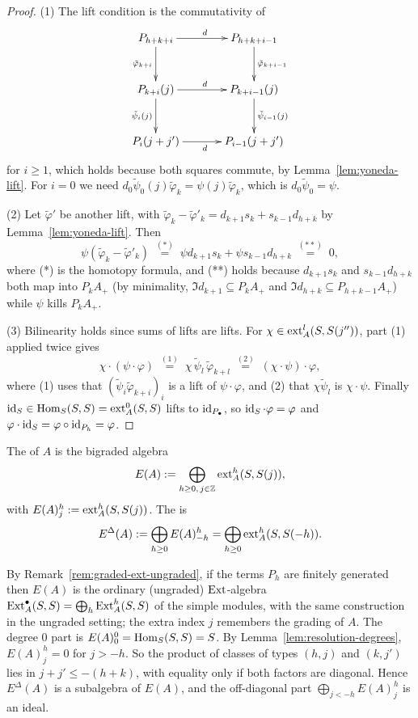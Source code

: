 \begin{proof}
(1) The lift condition is the commutativity of
\[
\xymatrix@C=34pt@R=30pt{
P_{h+k+i}\ar[r]^{d}\ar[d]_{\tilde\varphi_{k+i}}&P_{h+k+i-1}\ar[d]^{\tilde\varphi_{k+i-1}}\\
P_{k+i}(j)\ar[r]^{d}\ar[d]_{\tilde\psi_i(j)}&P_{k+i-1}(j)\ar[d]^{\tilde\psi_{i-1}(j)}\\
P_i(j+j')\ar[r]_{d}&P_{i-1}(j+j')
}
\]
for $i\geq1$, which holds because both squares commute, by Lemma~\ref{lem:yoneda-lift}.
For $i=0$ we need $d_0\tilde\psi_0(j)\tilde\varphi_k=\psi(j)\tilde\varphi_k$, which is $d_0\tilde\psi_0=\psi$.

(2) Let $\tilde\varphi'$ be another lift, with $\tilde\varphi_k-\tilde\varphi'_k=d_{k+1}s_k+s_{k-1}d_{h+k}$ by Lemma~\ref{lem:yoneda-lift}.
Then
\[
\psi(\tilde\varphi_k-\tilde\varphi'_k)\;\overset{(*)}{=}\;\psi d_{k+1}s_k+\psi s_{k-1}d_{h+k}\;\overset{(**)}{=}\;0,
\]
where (*) is the homotopy formula, and (**) holds because $d_{k+1}s_k$ and $s_{k-1}d_{h+k}$ both map into $P_kA_+$ (by minimality, $\Im d_{k+1}\subseteq P_kA_+$ and $\Im d_{h+k}\subseteq P_{h+k-1}A_+$) while $\psi$ kills $P_kA_+$.

(3) Bilinearity holds since sums of lifts are lifts.
For $\chi\in\operatorname{ext}\nolimits_A^l(S,S(j''))$, part (1) applied twice gives
\[
\chi\cdot(\psi\cdot\varphi)\;\overset{(1)}{=}\;\chi\,\tilde\psi_l\,\tilde\varphi_{k+l}\;\overset{(2)}{=}\;(\chi\cdot\psi)\cdot\varphi,
\]
where (1) uses that $(\tilde\psi_i\tilde\varphi_{k+i})_i$ is a lift of $\psi\cdot\varphi$, and (2) that $\chi\tilde\psi_l$ is $\chi\cdot\psi$.
Finally $\operatorname{id}_S\in\operatorname{Hom}\nolimits_S(S,S)=\operatorname{ext}\nolimits_A^0(S,S)$ lifts to $\operatorname{id}_{P_\bullet}$, so $\operatorname{id}_S\cdot\varphi=\varphi$ and $\varphi\cdot\operatorname{id}_S=\varphi\circ\operatorname{id}_{P_h}=\varphi$.
\end{proof}

\begin{definition}\label{def:yoneda-algebra}
The  of $A$ is the bigraded algebra
\[
E(A):=\bigoplus_{h\geq0,\,j\in\mathbb{Z}}\operatorname{ext}\nolimits_A^h(S,S(j)),
\]
with $E(A)^h_j:=\operatorname{ext}\nolimits_A^h(S,S(j))$.
The  is
\[
E^\Delta(A):=\bigoplus_{h\geq0}E(A)^h_{-h}=\bigoplus_{h\geq0}\operatorname{ext}\nolimits_A^h(S,S(-h)).
\]
\end{definition}

By Remark~\ref{rem:graded-ext-ungraded}, if the terms $P_h$ are finitely generated then $E(A)$ is the ordinary (ungraded) $\operatorname{Ext}\nolimits$-algebra $\operatorname{Ext}\nolimits_A^\bullet(S,S)=\bigoplus_h\operatorname{Ext}\nolimits_A^h(S,S)$ of the simple modules, with the same construction in the ungraded setting; the extra index $j$ remembers the grading of $A$.
The degree $0$ part is $E(A)^0_0=\operatorname{Hom}\nolimits_S(S,S)=S$.
By Lemma~\ref{lem:resolution-degrees}, $E(A)^h_j=0$ for $j>-h$.
So the product of classes of types $(h,j)$ and $(k,j')$ lies in $j+j'\leq-(h+k)$, with equality only if both factors are diagonal.
Hence $E^\Delta(A)$ is a subalgebra of $E(A)$, and the off-diagonal part $\bigoplus_{j<-h}E(A)^h_j$ is an ideal.

